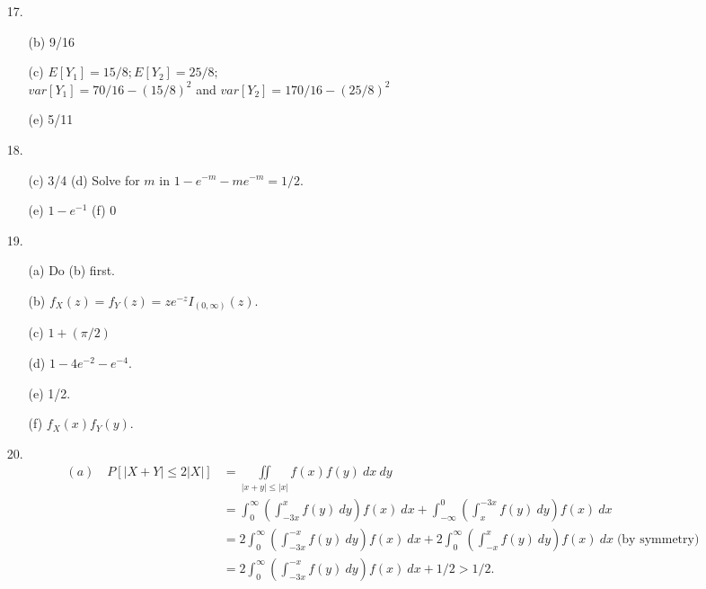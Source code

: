 \begin{enumerate}
	\item[17.] ${}$\vspace{-7.0ex} \begin{itemize}
		\item[(b)] 9/16
		\item[(c)] $E[Y_1] = 15/8; E[Y_2] = 25/8;$ \\ $var[Y_1] = 70/16 - (15/8)^2$ and $var[Y_2] = 170/16 - (25/8)^2$
		\item[(e)] 5/11
	\end{itemize}

	\item[18.] ${}$\vspace{-7.0ex} \begin{itemize}
		\item[(c)] 3/4\;\; (d) Solve for $m$ in $1 - e^{-m} - me^{-m} = 1/2.$ 
		\item[(e)] $1-e^{-1}$ \;\; (f) 0
	\end{itemize}

	\item[19.] ${}$\vspace{-7.0ex} \begin{itemize}
		\item[(a)] Do (b) first.
		\item[(b)] $f_X(z) = f_Y(z) = ze^{-z}I_{(0,\infty)}(z).$
		\item[(c)] $1 + (\pi/2)$ 
		\item[(d)] $1 - 4e^{-2} - e^{-4}.$ 
		\item[(e)] 1/2.
		\item[(f)] $f_X(x)f_Y(y).$
	\end{itemize}
	
	\newpage
	\item[20.] ${}$\vspace{-7.0ex} \begin{align*}
		(a)\quad P[\vert X + Y\vert \le 2\vert X\vert] &= \displaystyle \iint\limits_{\vert x+y\vert \le \vert x\vert}f(x)f(y)\ dx\ dy \\
		&= \displaystyle \int_0^\infty\left(\int_{-3x}^x f(y)\ dy\right) f(x)\ dx + \int_{-\infty}^0 \left(\int_x^{-3x} f(y)\ dy\right) f(x)\ dx \\
		&=  \displaystyle 2\int_0^\infty\left(\int_{-3x}^{-x} f(y)\ dy\right) f(x)\ dx + 2\int_0^{\infty} \left(\int_{-x}^x f(y)\ dy\right) f(x)\ dx\; \text{(by symmetry)} \\
		&= \displaystyle 2\int_0^\infty\left(\int_{-3x}^{-x} f(y)\ dy\right) f(x)\ dx + 1/2 > 1/2.
		\end{align*}


\end{enumerate}

